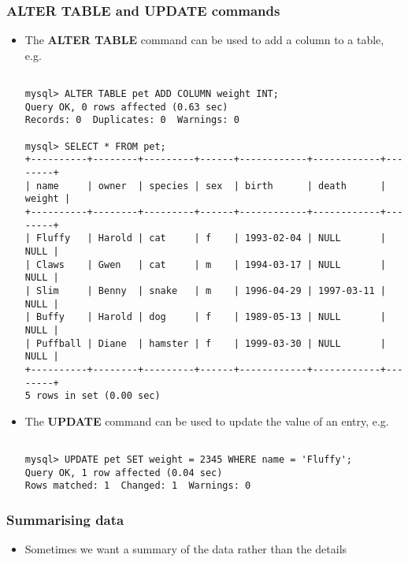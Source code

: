 \documentclass[hyperref={pdfpagelabels=false},svgnames,xcolor=table]{beamer}
\begin{document}
\begin{frame}[shrink=10,fragile]
  \frametitle{ALTER TABLE and UPDATE commands}
  \begin{itemize}
    \item The \textbf{ALTER TABLE} command can be used to add a
      column to a table, e.g.\
\begin{scriptsize}
\begin{verbatim}

mysql> ALTER TABLE pet ADD COLUMN weight INT;
Query OK, 0 rows affected (0.63 sec)
Records: 0  Duplicates: 0  Warnings: 0

mysql> SELECT * FROM pet;
+----------+--------+---------+------+------------+------------+--------+
| name     | owner  | species | sex  | birth      | death      | weight |
+----------+--------+---------+------+------------+------------+--------+
| Fluffy   | Harold | cat     | f    | 1993-02-04 | NULL       |   NULL |
| Claws    | Gwen   | cat     | m    | 1994-03-17 | NULL       |   NULL |
| Slim     | Benny  | snake   | m    | 1996-04-29 | 1997-03-11 |   NULL |
| Buffy    | Harold | dog     | f    | 1989-05-13 | NULL       |   NULL |
| Puffball | Diane  | hamster | f    | 1999-03-30 | NULL       |   NULL |
+----------+--------+---------+------+------------+------------+--------+
5 rows in set (0.00 sec)

\end{verbatim}
\end{scriptsize}
    \item The \textbf{UPDATE} command can be used to update the value of
      an entry, e.g.\
\begin{scriptsize}
\begin{verbatim}

mysql> UPDATE pet SET weight = 2345 WHERE name = 'Fluffy';
Query OK, 1 row affected (0.04 sec)
Rows matched: 1  Changed: 1  Warnings: 0
\end{verbatim}
\end{scriptsize}
  \end{itemize}
\end{frame}

\begin{frame}
  \frametitle{Summarising data}
  \begin{itemize}
    \item Sometimes we want a summary of the data rather than the details 
  \end{itemize}
\end{frame}
\end{document}
